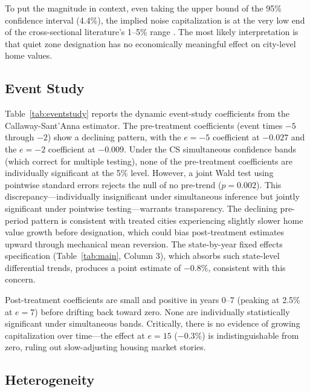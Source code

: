 \documentclass[12pt]{article}
\begin{document}
To put the magnitude in context, even taking the upper bound of the 95\% confidence interval (4.4\%), the implied noise capitalization is at the very low end of the cross-sectional literature's 1--5\% range \citep{theebe2004planes}. The most likely interpretation is that quiet zone designation has no economically meaningful effect on city-level home values.

\subsection{Event Study}



Table~\ref{tab:eventstudy} reports the dynamic event-study coefficients from the Callaway-Sant'Anna estimator. The pre-treatment coefficients (event times $-5$ through $-2$) show a declining pattern, with the $e = -5$ coefficient at $-0.027$ and the $e = -2$ coefficient at $-0.009$. Under the CS simultaneous confidence bands (which correct for multiple testing), none of the pre-treatment coefficients are individually significant at the 5\% level. However, a joint Wald test using pointwise standard errors rejects the null of no pre-trend ($p = 0.002$). This discrepancy---individually insignificant under simultaneous inference but jointly significant under pointwise testing---warrants transparency. The declining pre-period pattern is consistent with treated cities experiencing slightly slower home value growth before designation, which could bias post-treatment estimates upward through mechanical mean reversion. The state-by-year fixed effects specification (Table~\ref{tab:main}, Column 3), which absorbs such state-level differential trends, produces a point estimate of $-0.8\%$, consistent with this concern.

Post-treatment coefficients are small and positive in years 0--7 (peaking at 2.5\% at $e = 7$) before drifting back toward zero. None are individually statistically significant under simultaneous bands. Critically, there is no evidence of growing capitalization over time---the effect at $e = 15$ ($-0.3\%$) is indistinguishable from zero, ruling out slow-adjusting housing market stories.

\subsection{Heterogeneity}


\end{document}
